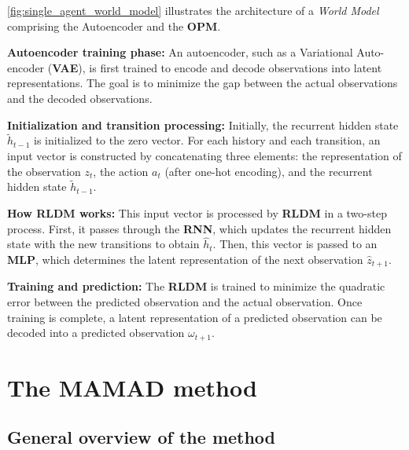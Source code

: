 \documentclass[pdflatex,sn-mathphys-num]{sn-jnl}%
\theoremstyle{thmstyleone}%
\theoremstyle{thmstyletwo}%
\theoremstyle{thmstylethree}%
\begin{document}
\autoref{fig:single_agent_world_model} illustrates the architecture of a \textit{World Model} comprising the Autoencoder and the \textbf{OPM}.

\textbf{Autoencoder training phase:} An autoencoder, such as a Variational Auto-encoder (\textbf{VAE}), is first trained to encode and decode observations into latent representations. The goal is to minimize the gap between the actual observations and the decoded observations.

\textbf{Initialization and transition processing:} Initially, the recurrent hidden state $\tilde{h}_{t-1}$ is initialized to the zero vector. For each history and each transition, an input vector is constructed by concatenating three elements: the representation of the observation $z_t$, the action $a_t$ (after one-hot encoding), and the recurrent hidden state $\tilde{h}_{t-1}$.

\textbf{How \textbf{RLDM} works:} This input vector is processed by \textbf{RLDM} in a two-step process. First, it passes through the \textbf{RNN}, which updates the recurrent hidden state with the new transitions to obtain $\hat{h}_t$. Then, this vector is passed to an \textbf{MLP}, which determines the latent representation of the next observation $\hat{z}_{t+1}$.

\textbf{Training and prediction:} The \textbf{RLDM} is trained to minimize the quadratic error between the predicted observation and the actual observation. Once training is complete, a latent representation of a predicted observation can be decoded into a predicted observation $\omega_{t+1}$.

\section{The MAMAD method}\label{sec:mamad}

\subsection{General overview of the method}
\end{document}
